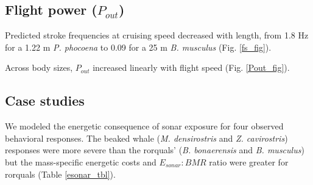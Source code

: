 \documentclass[]{elsarticle} %
\begin{document}
\subsection{\texorpdfstring{Flight power
(\(P_{out}\))}{Flight power (P\_\{out\})}}\label{flight-power-p_out-1}

Predicted stroke frequencies at cruising speed decreased with length,
from 1.8 Hz for a 1.22 m \emph{P. phocoena} to 0.09 for a 25 m \emph{B.
musculus} (Fig. \ref{fs_fig}).

Across body sizes, \(P_{out}\) increased linearly with flight speed
(Fig. \ref{Pout_fig}).

\subsection{Case studies}\label{case-studies-1}

We modeled the energetic consequence of sonar exposure for four observed
behavioral responses. The beaked whale (\emph{M. densirostris} and
\emph{Z. cavirostris}) responses were more severe than the rorquals'
(\emph{B. bonaerensis} and \emph{B. musculus}) but the mass-specific
energetic costs and \(E_{sonar}:BMR\) ratio were greater for rorquals
(Table \ref{esonar_tbl}).
\end{document}
